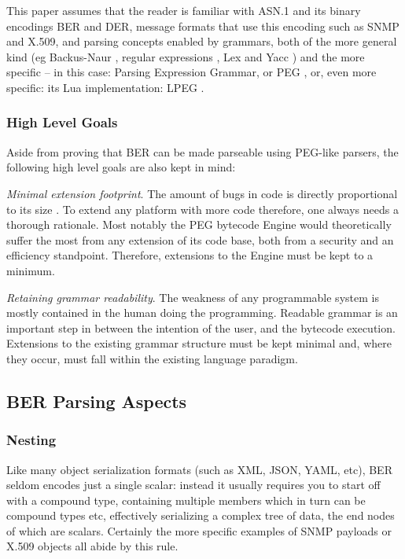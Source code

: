 This paper assumes that the reader is familiar with ASN.1 and its binary 
encodings BER and DER, message formats that use this encoding such as SNMP 
and X.509, and parsing concepts enabled by grammars, both of the more 
general kind (eg Backus-Naur \cite{bib:backusnaur},
regular expressions \cite{bib:regex}, Lex and Yacc \cite{bib:yacc}) and the 
more specific – in this case: Parsing Expression Grammar, or PEG
\cite{bib:peg}, or, 
even more specific: its Lua implementation: LPEG \cite{bib:lpeg}.

\subsubsection{High Level Goals}

Aside from proving that BER can be made parseable using PEG-like parsers, 
the following high level goals are also kept in mind:

\textit{Minimal extension footprint}. The amount of bugs in code is directly 
proportional to its size \cite{bib:bugs}.
To extend any platform with more code 
therefore, one always needs a thorough rationale. Most notably the PEG 
bytecode Engine would theoretically suffer the most from any extension of 
its code base, both from a security and an efficiency standpoint. 
Therefore, extensions to the Engine must be kept to a minimum.

\textit{Retaining grammar readability}.
The weakness of any programmable system is 
mostly contained in the human doing the programming. Readable grammar is 
an important step in between the intention of the user, and the bytecode 
execution. Extensions to the existing grammar structure must be kept 
minimal and, where they occur, must fall within the existing language 
paradigm.

\subsection{BER Parsing Aspects}

\subsubsection{Nesting}

Like many object serialization formats (such as XML, JSON, YAML, etc), BER 
seldom encodes just a single scalar: instead it usually requires you to 
start off with a compound type, containing multiple members which in turn 
can be compound types etc, effectively serializing a complex tree of data, 
the end nodes of which are scalars. Certainly the more specific examples 
of SNMP payloads or X.509 objects all abide by this rule.

